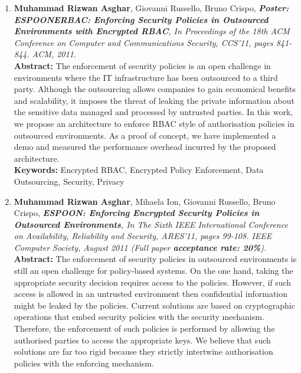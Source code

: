 \documentclass[epsfig,a4paper,11pt,titlepage]{book}
\numberwithin{algorithm}{chapter}
\begin{document}
\begin{enumerate}
\item \textbf{Muhammad Rizwan Asghar}, Giovanni Russello, Bruno Crispo, \textit{\textbf{Poster: \\ \gls{ESPOONERBAC}: Enforcing Security Policies in Outsourced Environments with Encrypted \gls{RBAC}}, In Proceedings of the 18th ACM Conference on Computer and Communications Security, CCS'11, pages 841-844. ACM, 2011.} \vspace{3mm} \\
\textbf{Abstract:} The enforcement of security policies is an open challenge in environments where the \gls{IT} infrastructure has been outsourced to a third party. Although the outsourcing allows companies to gain economical benefits and scalability, it imposes the threat of leaking the private information about the sensitive data managed and processed by untrusted parties. In this work, we propose an architecture to enforce \acrfull{RBAC} style of authorisation policies in outsourced environments. As a proof of concept, we have implemented a demo and measured the performance overhead incurred by the proposed architecture. \vspace{3mm} \\
\textbf{Keywords:} Encrypted \gls{RBAC}, Encrypted Policy Enforcement, Data Outsourcing, Security, Privacy
	
	\item \textbf{Muhammad Rizwan Asghar}, Mihaela Ion, Giovanni Russello, Bruno Crispo, \textit{\textbf{\gls{ESPOON}: Enforcing Encrypted Security Policies in Outsourced Environments}, In The Sixth IEEE International Conference on Availability, Reliability and Security, ARES'11, pages 99-108. IEEE Computer Society, August 2011 (Full paper \textbf{acceptance rate: 20\%}).} \vspace{3mm} \\
\textbf{Abstract:} The enforcement of security policies in outsourced environments is still an open challenge for policy-based systems. On the one hand, taking the appropriate security decision requires access to the policies. However, if such access is allowed in an untrusted environment then confidential information might be leaked by the policies. Current solutions are based on cryptographic operations that embed security policies with the security mechanism. Therefore, the enforcement of such policies is performed by allowing the authorised parties to access the appropriate keys. We believe that such solutions are far too rigid because they strictly intertwine authorisation policies with the enforcing mechanism.


\end{enumerate}
\end{document}
